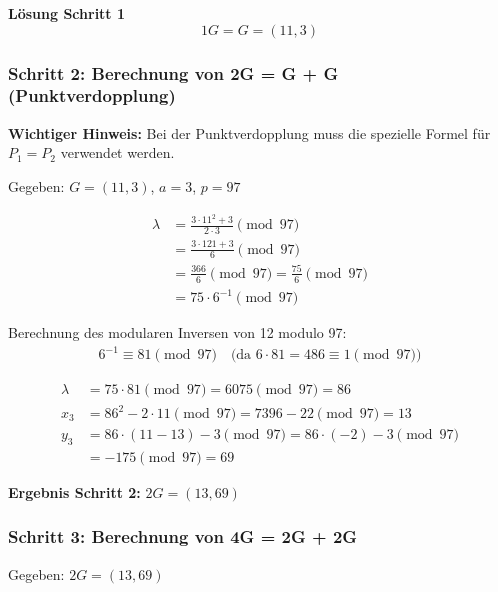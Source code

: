 \documentclass{article}
\begin{document}
\begin{solutionbox}
\textbf{Lösung Schritt 1}
\begin{equation}
1G = G = (11, 3)
\end{equation}
\end{solutionbox}

\subsubsection{Schritt 2: Berechnung von 2G = G + G (Punktverdopplung)}

\begin{warningbox}
\textbf{Wichtiger Hinweis:} Bei der Punktverdopplung muss die spezielle Formel für $P_1 = P_2$ verwendet werden.
\end{warningbox}

Gegeben: $G = (11, 3)$, $a = 3$, $p = 97$

\begin{align}
\lambda &= \frac{3 \cdot 11^2 + 3}{2 \cdot 3} \pmod{97} \\
&= \frac{3 \cdot 121 + 3}{6} \pmod{97} \\
&= \frac{366}{6} \pmod{97} =  \frac{75}{6} \pmod{97}\\
&= 75 \cdot 6^{-1} \pmod{97}
\end{align}

Berechnung des modularen Inversen von 12 modulo 97:
\begin{align}
6^{-1} \equiv 81 \pmod{97} \quad \text{(da } 6 \cdot 81 = 486 \equiv 1 \pmod{97}\text{)}
\end{align}

\begin{align}
\lambda &= 75 \cdot 81 \pmod{97} = 6075 \pmod{97} = 86 \\
x_3 &= 86^2 - 2 \cdot11 \pmod{97} = 7396 - 22 \pmod{97} = 13 \\
y_3 &= 86 \cdot (11 - 13) - 3 \pmod{97} = 86 \cdot (-2) - 3 \pmod{97} \\
&= -175 \pmod{97} = 69
\end{align}

\begin{solutionbox}
\textbf{Ergebnis Schritt 2:} $2G = (13, 69)$
\end{solutionbox}

\subsubsection{Schritt 3: Berechnung von 4G = 2G + 2G}
Gegeben: $2G = (13, 69)$
\end{document}
